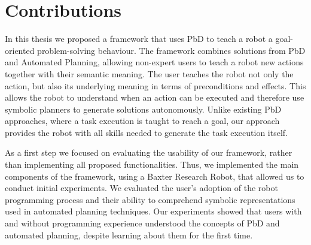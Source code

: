 \section{Contributions}
\label{sec:contributions}
In this thesis we proposed a framework that uses PbD to teach a robot a goal-oriented problem-solving behaviour.
The framework combines solutions from PbD and Automated Planning, allowing non-expert users to teach a robot new actions together with their semantic meaning.
The user teaches the robot not only the action, but also its underlying meaning in terms of preconditions and effects.
This allows the robot to understand when an action can be executed and therefore use symbolic planners to generate solutions autonomously.
Unlike existing PbD approaches, where a task execution is taught to reach a goal, our approach provides the robot with all skills needed to generate the task execution itself.

As a first step we focused on evaluating the usability of our framework, rather than implementing all proposed functionalities.
Thus, we implemented the main components of the framework, using a Baxter Research Robot, that allowed us to conduct initial experiments.
We evaluated the user's adoption of the robot programming process and their ability to comprehend symbolic representations used in automated planning techniques.
Our experiments showed that users with and without programming experience understood the concepts of PbD and automated planning, despite learning about them for the first time.

